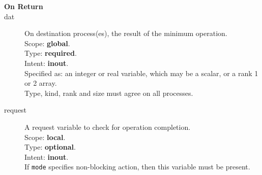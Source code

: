 \begin{description}
\item[\bf On Return]
\item[dat] On destination process(es), the result of the minimum operation.\\
Scope: {\bf global}.\\
Type: {\bf required}.\\
Intent: {\bf inout}.\\
Specified as: an integer  or  real variable, which may be a
scalar, or a rank 1 or 2 array. \\
Type, kind, rank and size must agree on all processes.
\item[request] A request variable to check for operation completion.\\
Scope: {\bf local}.\\
Type: {\bf optional}.\\
Intent: {\bf inout}.\\
If \verb|mode| specifies non-blocking action, then this
variable must be present.
\end{description}


